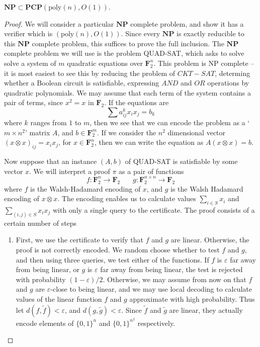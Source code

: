 \begin{theorem}
    $\mathbf{NP} \subset \mathbf{PCP}(\text{poly}(n), O(1))$.
\end{theorem}
\begin{proof}
    We will consider a particular $\mathbf{NP}$ complete problem, and show it has a verifier which is $(\text{poly}(n), O(1))$. Since every $\mathbf{NP}$ is exactly reducible to this $\mathbf{NP}$ complete problem, this suffices to prove the full inclusion. The $\mathbf{NP}$ complete problem we will use is the problem QUAD-SAT, which asks to solve solve a system of $m$ quadratic equations over $\mathbf{F}_2^n$. This problem is NP complete -- it is most easiest to see this by reducing the problem of $CKT-SAT$, determing whether a Boolean circuit is satisfiable, expressing $AND$ and $OR$ operations by quadratic polynomials. We may assume that each term of the system contains a pair of terms, since $x^2 = x$ in $\mathbf{F}_2$. If the equations are
    \[ \sum a^k_{ij} x_ix_j = b_k \]
    where $k$ ranges from $1$ to $m$, then we see that we can encode the problem as a `$m \times n^2$' matrix $A$, and $b \in \mathbf{F}_2^m$. If we consider the $n^2$ dimensional vector $(x \otimes x)_{ij} = x_i x_j$, for $x \in \mathbf{F}_2^n$, then we can write the equation as $A(x \otimes x) = b$.

    Now suppose that an instance $(A,b)$ of QUAD-SAT is satisfiable by some vector $x$. We will interpret a proof $\pi$ as a pair of functions
    \[ f: \mathbf{F}_2^n \to \mathbf{F}_2\ \ \ \ \ \ \ \ g: \mathbf{F}_2^{n \times n} \to \mathbf{F}_2 \]
    where $f$ is the Walsh-Hadamard encoding of $x$, and $g$ is the Walsh Hadamard encoding of $x \otimes x$. The encoding enables us to calculate values $\sum_{i \in S} x_i$ and $\sum_{(i,j) \in S} x_i x_j$ with only a single query to the certificate. The proof consists of a certain number of steps

    \begin{enumerate}
        \item First, we use the certificate to verify that $f$ and $g$ are linear. Otherwise, the proof is not correctly encoded. We random choose whether to test $f$ and $g$, and then using three queries, we test either of the functions. If $f$ is $\varepsilon$ far away from being linear, or $g$ is $\varepsilon$ far away from being linear, the test is rejected with probability $(1 - \varepsilon)/2$. Otherwise, we may assume from now on that $f$ and $g$ are $\varepsilon$-close to being linear, and we may use local decoding to calculate values of the linear function $f$ and $g$ approximate with high probability. Thus let $d(f,\tilde{f}) < \varepsilon$, and $d(g,\tilde{g}) < \varepsilon$. Since $\tilde{f}$ and $\tilde{g}$ are linear, they actually encode elements of $\{ 0,1 \}^n$ and $\{ 0, 1  \}^{n^2}$ respectively.


\end{enumerate}
\end{proof}
